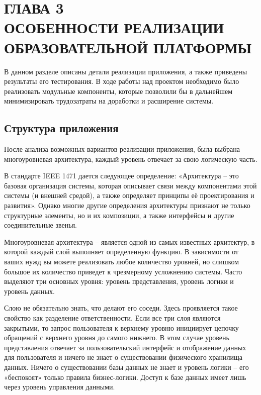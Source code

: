 \section*{ГЛАВА 3\\ ОСОБЕННОСТИ РЕАЛИЗАЦИИ ОБРАЗОВАТЕЛЬНОЙ ПЛАТФОРМЫ}
\setcounter{section}{3}\setcounter{subsection}{0}


В данном разделе описаны детали реализации приложения, а также приведены результаты его тестирования.
В ходе работы над проектом необходимо было реализовать модульные компоненты, которые позволили
бы в дальнейшем минимизировать трудозатраты на доработки и расширение системы.

\subsection{Структура приложения}

После анализа возможных вариантов реализации приложения, была выбрана многоуровневая архитектура,
каждый уровень отвечает за свою логическую часть.

В стандарте IEEE 1471 дается следующее определение: «Архитектура – это базовая организация
системы, которая описывает связи между компонентами этой системы (и внешней средой),
а также определяет принципы её проектирования и развития». Однако многие другие определения
архитектуры признают не только структурные элементы, но и их композиции, а также интерфейсы
и другие соединительные звенья.

Многоуровневая архитектура – является одной из самых известных архитектур, в которой
каждый слой выполняет определенную функцию. В зависимости от ваших нужд вы можете
реализовать любое количество уровней, но слишком большое их количество приведет к
чрезмерному усложнению системы. Часто выделяют три основных уровня: уровень представления,
уровень логики и уровень данных.

Слою не обязательно знать, что делают его соседи. Здесь проявляется такое свойство как
разделение ответственности. Если все три слоя являются закрытыми, то запрос пользователя
к верхнему уровню инициирует цепочку обращений с верхнего уровня до самого нижнего.
В этом случае уровень представления отвечает за пользовательский интерфейс и отображение
данных для пользователя и ничего не знает о существовании физического хранилища данных.
Ничего о существовании базы данных не знает и уровень логики – его «беспокоят» только
правила бизнес-логики. Доступ к базе данных имеет лишь через уровень управления данными.

